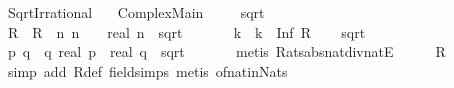 %
\begin{isabellebody}%
%
%
\isadelimtheory
%
\endisadelimtheory
%
\isatagtheory
{}\isamarkupfalse%
\ Sqrt{}{\isacharunderscore}{\kern0pt}Irrational\ \isanewline
\ \ Complex{\isacharunderscore}{\kern0pt}Main\isanewline
\ \ \ \isanewline
{}%
\endisatagtheory
{\isafoldtheory}%
%
\isadelimtheory
\isanewline
%
\endisadelimtheory
\isanewline
{}\isamarkupfalse%
\ {\isachardoublequoteopen}sqrt\ {}\ {\isasymnotin}\ {\isasymrat}{\isachardoublequoteclose}\isanewline
%
\isadelimproof
%
\endisadelimproof
%
\isatagproof
{}\isamarkupfalse%
\isanewline
\ \ \isamarkupfalse%
\ R\ \ {\isachardoublequoteopen}R\ {\isasymequiv}\ {\isacharbraceleft}{\kern0pt}n{\isachardot}{\kern0pt}\ n\ {\isachargreater}{\kern0pt}\ {}\ {\isasymand}\ real\ n\ {\isacharasterisk}{\kern0pt}\ sqrt\ {}\ {\isasymin}\ {\isasymnat}{\isacharbraceright}{\kern0pt}{\isachardoublequoteclose}\isanewline
\ \ \isamarkupfalse%
\ k\ \ {\isachardoublequoteopen}k\ {\isasymequiv}\ Inf\ R{\isachardoublequoteclose}\isanewline
\ \ \isamarkupfalse%
\ {\isachardoublequoteopen}sqrt\ {}\ {\isasymin}\ {\isasymrat}{\isachardoublequoteclose}\isanewline
\ \ \isamarkupfalse%
\ \isamarkupfalse%
\ p\ q\ \ {\isachardoublequoteopen}q{\isasymnoteq}{}{\isachardoublequoteclose}\ {\isachardoublequoteopen}real\ p\ {\isacharslash}{\kern0pt}\ real\ q\ {\isacharequal}{\kern0pt}\ {\isasymbar}sqrt\ {}{\isasymbar}{\isachardoublequoteclose}\isanewline
\ \ \ \ \isamarkupfalse%
\ {\isacharparenleft}{\kern0pt}metis\ Rats{\isacharunderscore}{\kern0pt}abs{\isacharunderscore}{\kern0pt}nat{\isacharunderscore}{\kern0pt}div{\isacharunderscore}{\kern0pt}natE{\isacharparenright}{\kern0pt}\isanewline
\ \ \isamarkupfalse%
\ \isamarkupfalse%
\ {\isachardoublequoteopen}R\ {\isasymnoteq}\ {\isacharbraceleft}{\kern0pt}{\isacharbraceright}{\kern0pt}{\isachardoublequoteclose}\isanewline
\ \ \ \ \isamarkupfalse%
\ {\isacharparenleft}{\kern0pt}simp\ add{\isacharcolon}{\kern0pt}\ R{\isacharunderscore}{\kern0pt}def\ field{\isacharunderscore}{\kern0pt}simps{\isacharparenright}{\kern0pt}\ {\isacharparenleft}{\kern0pt}metis\ of{\isacharunderscore}{\kern0pt}nat{\isacharunderscore}{\kern0pt}in{\isacharunderscore}{\kern0pt}Nats{\isacharparenright}{\kern0pt}\isanewline

\end{isabellebody}
